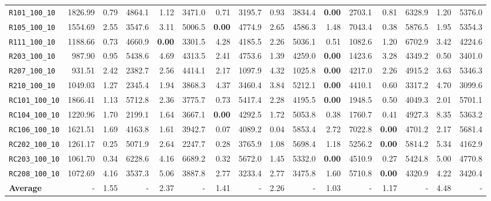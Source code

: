 \begin{table}[ht]
\begin{adjustbox}{width=\textwidth}
\begin{tabular}{l r r r @{\hspace{8pt}} r r @{\hspace{8pt}} r r @{\hspace{8pt}} r r @{\hspace{8pt}} r r @{\hspace{8pt}} r r @{\hspace{8pt}} r r @{\hspace{8pt}}}
\texttt{R101\_100\_10} & 1826.99 & 0.79 & 4864.1 & 1.12 & 3471.0 & 0.71 & 3195.7 & 0.93 & 3834.4 & \textbf{0.00} & 2703.1 & 0.81 & 6328.9 & 1.20 & 5376.0 \\
\texttt{R105\_100\_10} & 1554.69 & 2.55 & 3547.6 & 3.11 & 5006.5 & \textbf{0.00} & 4774.9 & 2.65 & 4586.3 & 1.48 & 7043.4 & 0.38 & 5876.5 & 1.95 & 5354.3 \\
\texttt{R111\_100\_10} & 1188.66 & 0.73 & 4660.9 & \textbf{0.00} & 3301.5 & 4.28 & 4185.5 & 2.26 & 5036.1 & 0.51 & 1082.6 & 1.20 & 6702.9 & 3.42 & 4224.6 \\
\texttt{R203\_100\_10} & 987.90 & 0.95 & 5438.6 & 4.69 & 4313.5 & 2.41 & 4753.6 & 1.39 & 4259.0 & \textbf{0.00} & 1423.6 & 3.28 & 4349.2 & 0.50 & 3401.0 \\
\texttt{R207\_100\_10} & 931.51 & 2.42 & 2382.7 & 2.56 & 4414.1 & 2.17 & 1097.9 & 4.32 & 1025.8 & \textbf{0.00} & 4217.0 & 2.26 & 4915.2 & 3.63 & 5346.3 \\
\texttt{R210\_100\_10} & 1049.03 & 1.27 & 2345.4 & 1.94 & 3868.3 & 4.37 & 3460.4 & 3.84 & 5212.1 & \textbf{0.00} & 4410.1 & 0.60 & 3317.2 & 4.70 & 3099.6 \\
\texttt{RC101\_100\_10} & 1866.41 & 1.13 & 5712.8 & 2.36 & 3775.7 & 0.73 & 5417.4 & 2.28 & 4195.5 & \textbf{0.00} & 1948.5 & 0.50 & 4049.3 & 2.01 & 5701.1 \\
\texttt{RC104\_100\_10} & 1220.96 & 1.70 & 2199.1 & 1.64 & 3667.1 & \textbf{0.00} & 4292.5 & 1.72 & 5053.8 & 0.38 & 1760.7 & 0.41 & 4927.3 & 8.35 & 5363.2 \\
\texttt{RC106\_100\_10} & 1621.51 & 1.69 & 4163.8 & 1.61 & 3942.7 & 0.07 & 4089.2 & 0.04 & 5853.4 & 2.72 & 7022.8 & \textbf{0.00} & 4701.2 & 2.17 & 5681.4 \\
\texttt{RC202\_100\_10} & 1261.17 & 0.25 & 5071.9 & 2.64 & 2247.7 & 0.28 & 3765.9 & 1.08 & 5698.4 & 1.18 & 5256.2 & \textbf{0.00} & 5814.2 & 5.34 & 4162.9 \\
\texttt{RC203\_100\_10} & 1061.70 & 0.34 & 6228.6 & 4.16 & 6689.2 & 0.32 & 5672.0 & 1.45 & 5332.0 & \textbf{0.00} & 4510.9 & 0.27 & 5424.8 & 5.00 & 4770.8 \\
\texttt{RC208\_100\_10} & 1072.69 & 4.16 & 3537.3 & 5.06 & 3887.8 & 2.77 & 3233.4 & 2.77 & 3475.8 & 1.60 & 5710.8 & \textbf{0.00} & 4320.9 & 4.22 & 3420.4 \\
\midrule
\textbf{Average} & - & 1.55 & - & 2.37 & - & 1.41 & - & 2.26 & - & 1.03 & - & 1.17 & - & 4.48 & - \\
\bottomrule
\end{tabular}
\end{adjustbox}
\end{table}